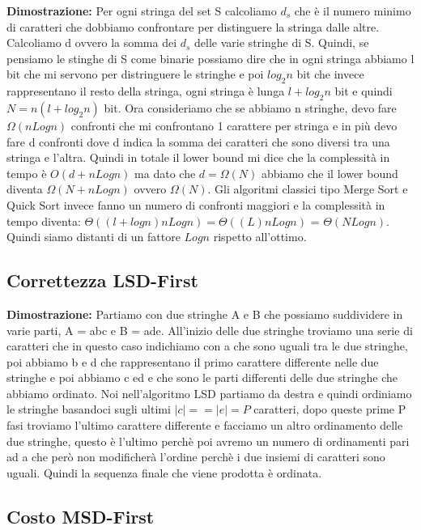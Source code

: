 \documentclass[12pt]{article}
\begin{document}
\textbf{Dimostrazione:} Per ogni stringa del set S calcoliamo $d_s$ che è il numero minimo di caratteri che dobbiamo confrontare per distinguere la stringa dalle altre. Calcoliamo d ovvero la somma dei $d_s$ delle varie stringhe di S. 
Quindi, se pensiamo le stinghe di S come binarie possiamo dire che in ogni stringa abbiamo l bit che mi servono per distringuere le stringhe e poi $log_2 n$ bit che invece rappresentano il resto della stringa, ogni stringa è lunga $l+log_2 n$ bit e quindi $N=n(l+log_2 n)$ bit.
Ora consideriamo che se abbiamo n stringhe, devo fare $\Omega(nLogn)$ confronti che mi confrontano 1 carattere per stringa e in più devo fare d confronti dove d indica la somma dei caratteri che sono diversi tra una stringa e l'altra. Quindi in totale il lower bound mi dice che la complessità in tempo è $O(d+nLogn)$ ma dato che $d=\Omega(N)$ abbiamo che il lower bound diventa $\Omega(N+nLogn)$ ovvero $\Omega(N)$.
Gli algoritmi classici tipo Merge Sort e Quick Sort invece fanno un numero di confronti maggiori e la complessità in tempo diventa: $\Theta((l+logn)nLogn) = \Theta((L)nLogn) $ = $\Theta(NLogn)$.
Quindi siamo distanti di un fattore $Logn$ rispetto all'ottimo.

\subsection{Correttezza LSD-First}

\textbf{Dimostrazione:} Partiamo con due stringhe A e B che possiamo suddividere in varie parti, A = abc e B = ade.
All'inizio delle due stringhe troviamo una serie di caratteri che in questo caso indichiamo con a che sono uguali tra le due stringhe, poi abbiamo b e d che rappresentano il primo carattere differente nelle due stringhe e poi abbiamo c ed e che sono le parti differenti delle due stringhe che abbiamo ordinato.
Noi nell'algoritmo LSD partiamo da destra e quindi ordiniamo le stringhe basandoci sugli ultimi $|c| == |e| = P$ caratteri, dopo queste prime P fasi troviamo l'ultimo carattere differente e facciamo un altro ordinamento delle due stringhe, questo è l'ultimo perchè poi avremo un numero di ordinamenti pari ad a che però non modificherà l'ordine perchè i due insiemi di caratteri sono uguali. Quindi la sequenza finale che viene prodotta è ordinata.

\subsection{Costo MSD-First}
\end{document}
